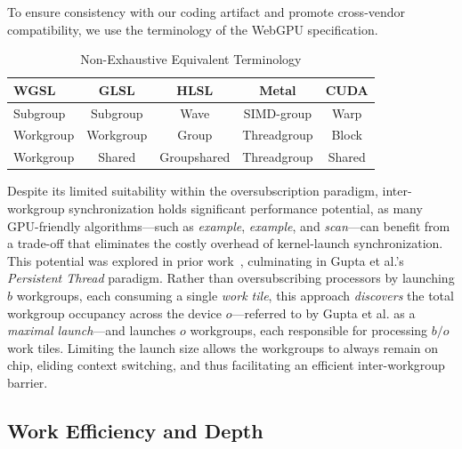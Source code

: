 \documentclass[sigconf]{acmart}
\begin{document}
To ensure consistency with our coding artifact and promote cross-vendor compatibility, we use the terminology of the WebGPU specification.
\setlength{\tabcolsep}{3pt}
\begin{table}[h]
  \centering
  \caption{Non-Exhaustive Equivalent Terminology}
  \label{tab:terminology}
  \begin{tabular}{lcccc}
    \toprule
    \textbf{WGSL} & \textbf{GLSL} & \textbf{HLSL} & \textbf{Metal} & \textbf{CUDA} \\ \midrule
    Subgroup      & Subgroup      & Wave          & SIMD-group     & Warp          \\
    Workgroup     & Workgroup     & Group         & Threadgroup    & Block         \\
    Workgroup     & Shared        & Groupshared   & Threadgroup    & Shared        \\ \bottomrule
  \end{tabular}
\end{table}

Despite its limited suitability within the oversubscription paradigm, inter-workgroup synchronization holds significant performance potential, as many GPU-friendly algorithms—such as \emph{example}, \emph{example}, and \emph{scan}---can benefit from a trade-off that eliminates the costly overhead of kernel-launch synchronization. This potential was explored in prior work~\cite{}, culminating in Gupta et al.’s~\cite{} \emph{Persistent Thread} paradigm. Rather than oversubscribing processors by launching $b$ workgroups, each consuming a single \emph{work tile}, this approach \emph{discovers} the total workgroup occupancy across the device $o$---referred to by Gupta et al. as a \emph{maximal launch}---and launches $o$ workgroups, each responsible for processing $b/o$ work tiles. Limiting the launch size allows the workgroups to always remain on chip, eliding context switching, and thus facilitating an efficient inter-workgroup barrier.

\subsection{Work Efficiency and Depth}
\end{document}
